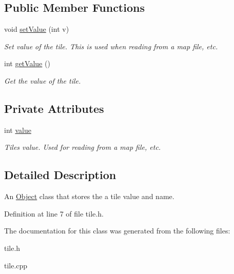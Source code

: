\subsection*{Public Member Functions}
\begin{DoxyCompactItemize}
\item 
void \hyperlink{classTile_ae3d9e4ace265389dd0e0cf3d62ad6ff3}{set\+Value} (int v)\hypertarget{classTile_ae3d9e4ace265389dd0e0cf3d62ad6ff3}{}\label{classTile_ae3d9e4ace265389dd0e0cf3d62ad6ff3}

\begin{DoxyCompactList}\small\item\em Set value of the tile. This is used when reading from a map file, etc. \end{DoxyCompactList}\item 
int \hyperlink{classTile_aaab3d77d23e378c207ec50e6786052e0}{get\+Value} ()\hypertarget{classTile_aaab3d77d23e378c207ec50e6786052e0}{}\label{classTile_aaab3d77d23e378c207ec50e6786052e0}

\begin{DoxyCompactList}\small\item\em Get the value of the tile. \end{DoxyCompactList}\end{DoxyCompactItemize}
\subsection*{Private Attributes}
\begin{DoxyCompactItemize}
\item 
int \hyperlink{classTile_abc4813aabaaf0451b10bb45ed713bc7e}{value}\hypertarget{classTile_abc4813aabaaf0451b10bb45ed713bc7e}{}\label{classTile_abc4813aabaaf0451b10bb45ed713bc7e}

\begin{DoxyCompactList}\small\item\em Tiles value. Used for reading from a map file, etc. \end{DoxyCompactList}\end{DoxyCompactItemize}


\subsection{Detailed Description}
An \hyperlink{classObject}{Object} class that stores the a tile value and name. 

Definition at line 7 of file tile.\+h.



The documentation for this class was generated from the following files\+:\begin{DoxyCompactItemize}
\item 
tile.\+h\item 
tile.\+cpp\end{DoxyCompactItemize}
